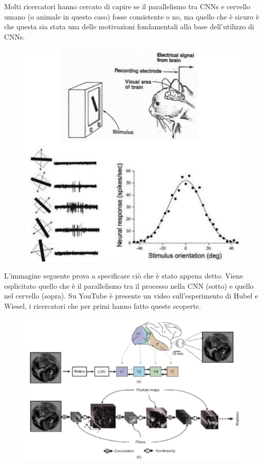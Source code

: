Molti ricercatori hanno cercato di capire se il parallelismo tra CNNs e cervello umano (o animale in questo caso) fosse consistente o no, ma quello che è sicuro è che questa sia stata una delle motivazioni fondamentali alla base dell'utilizzo di CNNs.
\begin{figure}[!h]
    \includegraphics[scale=.45]{images/cnn/cat_brain.png}
    \centering
\end{figure}


L'immagine seguente prova a specificare ciò che è stato appena detto. 
Viene esplicitato quello che è il parallelismo tra il processo nella CNN 
(sotto) e quello nel cervello (sopra). Su YouTube è presente un video 
sull'esperimento di Hubel e Wiesel, i ricercatori che per primi hanno fatto queste scoperte.
\begin{figure}[!h]
    \includegraphics[scale=.35]{images/cnn/exp.png}
    \centering
\end{figure}
\newpage